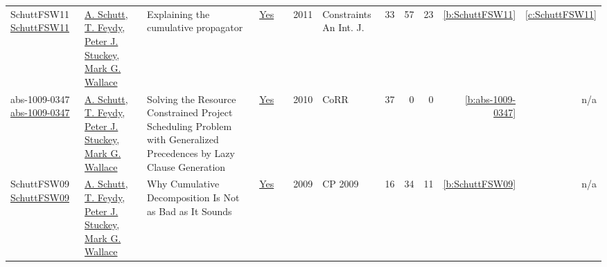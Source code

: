 {\begin{longtable}{>{\raggedright\arraybackslash}p{3cm}>{\raggedright\arraybackslash}p{6cm}>{\raggedright\arraybackslash}p{6.5cm}rrrp{2.5cm}rrrrr}
SchuttFSW11 \href{https://doi.org/10.1007/s10601-010-9103-2}{SchuttFSW11} & \hyperref[auth:a125]{A. Schutt}, \hyperref[auth:a155]{T. Feydy}, \hyperref[auth:a126]{Peter J. Stuckey}, \hyperref[auth:a117]{Mark G. Wallace} & Explaining the cumulative propagator & \href{../works/SchuttFSW11.pdf}{Yes} & \cite{SchuttFSW11} & 2011 & Constraints An Int. J. & 33 & 57 & 23 & \ref{b:SchuttFSW11} & \ref{c:SchuttFSW11}\\
abs-1009-0347 \href{http://arxiv.org/abs/1009.0347}{abs-1009-0347} & \hyperref[auth:a125]{A. Schutt}, \hyperref[auth:a155]{T. Feydy}, \hyperref[auth:a126]{Peter J. Stuckey}, \hyperref[auth:a117]{Mark G. Wallace} & Solving the Resource Constrained Project Scheduling Problem with Generalized Precedences by Lazy Clause Generation & \href{../works/abs-1009-0347.pdf}{Yes} & \cite{abs-1009-0347} & 2010 & CoRR & 37 & 0 & 0 & \ref{b:abs-1009-0347} & n/a\\
SchuttFSW09 \href{https://doi.org/10.1007/978-3-642-04244-7_58}{SchuttFSW09} & \hyperref[auth:a125]{A. Schutt}, \hyperref[auth:a155]{T. Feydy}, \hyperref[auth:a126]{Peter J. Stuckey}, \hyperref[auth:a117]{Mark G. Wallace} & Why Cumulative Decomposition Is Not as Bad as It Sounds & \href{../works/SchuttFSW09.pdf}{Yes} & \cite{SchuttFSW09} & 2009 & CP 2009 & 16 & 34 & 11 & \ref{b:SchuttFSW09} & n/a\\
\end{longtable}
}

\clearpage
